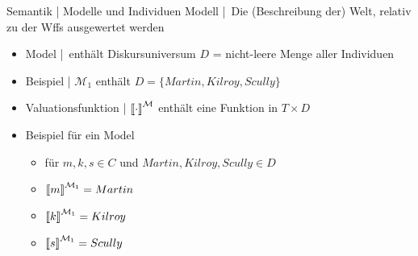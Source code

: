 \begin{frame}
  {Semantik | Modelle und Individuen}
  \onslide<+->
  \onslide<+->
  \alert{Modell} | Die (Beschreibung der) Welt, relativ zu der Wffs ausgewertet werden\\
  \Halbzeile
  \begin{itemize}[<+->]
    \item \alert{Model} \Model | enthält \alert{Diskursuniversum} $D$ = nicht-leere Menge aller Individuen
    \item Beispiel | ${\mathcal M}_1$ enthält $D=\{Martin,Kilroy,Scully\}$
      \Halbzeile
    \item \alert{Valuationsfunktion} | ${\llbracket{}\cdot\rrbracket}^{\mathcal{M}}$ enthält eine Funktion in $T\times D$
      \Viertelzeile
    \item Beispiel für ein Model \Model{}
      \begin{itemize}[<+->]
        \item für $m,k,s\in C$ und $Martin, Kilroy, Scully\in D$
        \item ${\llbracket{}m\rrbracket}^{\mathcal{M}_1}=Martin$
        \item ${\llbracket{}k\rrbracket}^{\mathcal{M}_1}=Kilroy$
        \item ${\llbracket{}s\rrbracket}^{\mathcal{M}_1}=Scully$
      \end{itemize}
  \end{itemize}
\end{frame}


